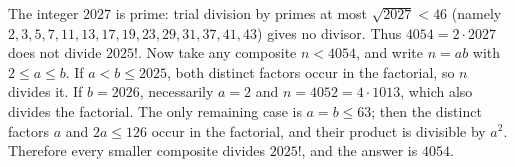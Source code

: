 The integer $2027$ is prime: trial division by primes at most $\sqrt{2027}<46$ (namely $2,3,5,7,11,13,17,19,23,29,31,37,41,43$) gives no divisor. Thus $4054=2\cdot2027$ does not divide $2025!$. Now take any composite $n<4054$, and write $n=ab$ with $2\le a\le b$. If $a<b\le2025$, both distinct factors occur in the factorial, so $n$ divides it. If $b=2026$, necessarily $a=2$ and $n=4052=4\cdot1013$, which also divides the factorial. The only remaining case is $a=b\le63$; then the distinct factors $a$ and $2a\le126$ occur in the factorial, and their product is divisible by $a^2$. Therefore every smaller composite divides $2025!$, and the answer is $\boxed{4054}$.

